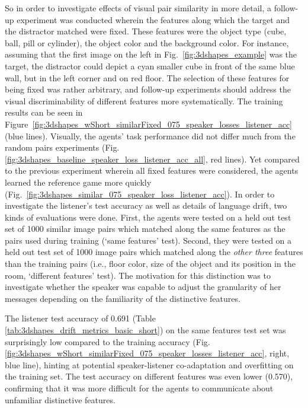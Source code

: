 So in order to investigate effects of visual pair similarity in more detail, a follow-up experiment was conducted wherein the features along which the target and the distractor matched were fixed. These features were the object type (cube, ball, pill or cylinder), the object color and the background color. For instance, assuming that the first image on the left in Fig.~\ref{fig:3dshapes_example} was the target, the distractor could depict a cyan smaller cube in front of the same blue wall, but in the left corner and on red floor.
The selection of these features for being fixed was rather arbitrary, and follow-up experiments should address the visual discriminability of different features more systematically. The training results can be seen in Figure~\ref{fig:3dshapes_wShort_similarFixed_075_speaker_losses_listener_acc} (blue lines). Visually, the agents' task performance did not differ much from the random pairs experiments (Fig. \ref{fig:3dshapes_baseline_speaker_loss_listener_acc_all}, red lines). Yet compared to the previous experiment wherein all fixed features were considered, the agents learned the reference game more quickly (Fig.~\ref{fig:3dshapes_similar_075_speaker_loss_listener_acc}). In order to investigate the listener's test accuracy as well as details of language drift, two kinds of evaluations were done. First, the agents were tested on a held out test set of 1000 similar image pairs which matched along the same features as the pairs used during training (`same features' test). Second, they were tested on a held out test set of 1000 image pairs which matched along the \emph{other three} features than the training pairs (i.e., floor color, size of the object and its position in the room, `different features' test). The motivation for this distinction was to investigate whether the speaker was capable to adjust the granularity of her messages depending on the familiarity of the distinctive features.

The listener test accuracy of 0.691 (Table \ref{tab:3dshapes_drift_metrics_basic_short}) on the same features test set was surprisingly low compared to the training accuracy (Fig. \ref{fig:3dshapes_wShort_similarFixed_075_speaker_losses_listener_acc}, right, blue line), hinting at potential speaker-listener co-adaptation and overfitting on the training set. The test accuracy on different features was even lower (0.570), confirming that it was more difficult for the agents to communicate about unfamiliar distinctive features. 


